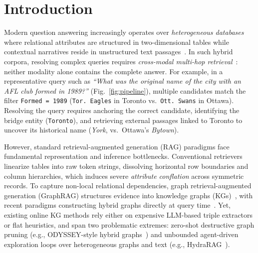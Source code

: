 \documentclass[runningheads]{llncs}
\begin{document}
\section{Introduction}
Modern question answering increasingly operates over \emph{heterogeneous databases} where relational attributes are structured in two-dimensional tables while contextual narratives reside in unstructured text passages~\cite{zhou2026tableqasurvey}. In such hybrid corpora, resolving complex queries requires \emph{cross-modal multi-hop retrieval}~\cite{hybridqa}: neither modality alone contains the complete answer. For example, in a representative query such as \emph{``What was the original name of the city with an AFL club formed in 1989?''} (Fig.~\ref{fig:pipeline}), multiple candidates match the filter \texttt{Formed = 1989} (\texttt{Tor. Eagles} in Toronto vs.\ \texttt{Ott. Swans} in Ottawa). Resolving the query requires anchoring the correct candidate, identifying the bridge entity (\texttt{Toronto}), and retrieving external passages linked to Toronto to uncover its historical name (\emph{York}, vs.\ Ottawa's \emph{Bytown}).

However, standard retrieval-augmented generation (RAG) paradigms face fundamental representation and inference bottlenecks. Conventional retrievers linearize tables into raw token strings, dissolving horizontal row boundaries and column hierarchies, which induces severe \emph{attribute conflation} across symmetric records. To capture non-local relational dependencies, graph retrieval-augmented generation (GraphRAG) structures evidence into knowledge graphs (KGs)~\cite{peng2024graphragsurvey}, with recent paradigms constructing hybrid graphs directly at query time~\cite{agarwal2025hybrid}. Yet, existing online KG methods rely either on expensive LLM-based triple extractors or flat heuristics, and span two problematic extremes: zero-shot destructive graph pruning (e.g., ODYSSEY-style hybrid graphs~\cite{agarwal2025hybrid}) and unbounded agent-driven exploration loops over heterogeneous graphs and text (e.g., HydraRAG~\cite{tan2025hydrarag}).
\end{document}
